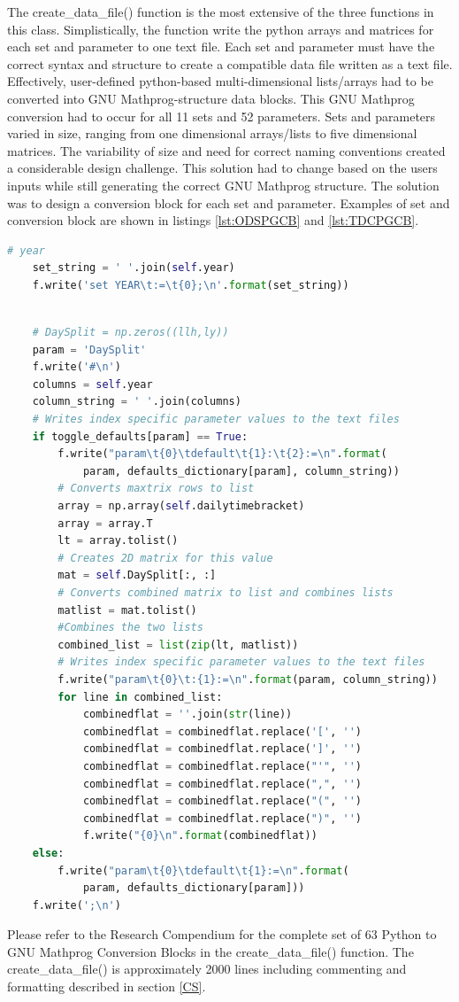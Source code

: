 \documentclass[12pt]{article}
\begin{document}
The create\_data\_file() function is the most extensive of the three functions in this class.
Simplistically, the function write the python arrays and matrices for each set and parameter to one text file.
Each set and parameter must have the correct syntax and structure to create a compatible data file written as a text file.
Effectively, user-defined python-based multi-dimensional lists/arrays had to be converted into GNU Mathprog-structure data blocks.
This GNU Mathprog conversion had to occur for all 11 sets and 52 parameters.
Sets and parameters varied in size, ranging from one dimensional arrays/lists to five dimensional matrices.
The variability of size and need for correct naming conventions created a considerable design challenge.
This solution had to change based on the users inputs while still generating the correct GNU Mathprog structure.
The solution was to design a conversion block for each set and parameter. 
Examples of set and conversion block are shown in listings \ref{lst:ODSPGCB} and \ref{lst:TDCPGCB}.

\begin{lstlisting}[language=Python,label = {lst:ODSPGCB},caption = {One Dimensional Set Python to GNU Mathprog Conversion Block}]
	# year
	set_string = ' '.join(self.year)
	f.write('set YEAR\t:=\t{0};\n'.format(set_string))
\end{lstlisting}

\begin{lstlisting}[language=Python,label = {lst:TDCPGCB},caption = Two Dimensional Parameter Python to GNU Mathprog Conversion Block]

	# DaySplit = np.zeros((llh,ly))
	param = 'DaySplit'
	f.write('#\n')
	columns = self.year
	column_string = ' '.join(columns)
	# Writes index specific parameter values to the text files
	if toggle_defaults[param] == True:
		f.write("param\t{0}\tdefault\t{1}:\t{2}:=\n".format(
			param, defaults_dictionary[param], column_string))
		# Converts maxtrix rows to list
		array = np.array(self.dailytimebracket)
		array = array.T
		lt = array.tolist()
		# Creates 2D matrix for this value
		mat = self.DaySplit[:, :]
		# Converts combined matrix to list and combines lists
		matlist = mat.tolist()
		#Combines the two lists
		combined_list = list(zip(lt, matlist))
		# Writes index specific parameter values to the text files
		f.write("param\t{0}\t:{1}:=\n".format(param, column_string))
		for line in combined_list:
			combinedflat = ''.join(str(line))
			combinedflat = combinedflat.replace('[', '')
			combinedflat = combinedflat.replace(']', '')
			combinedflat = combinedflat.replace("'", '')
			combinedflat = combinedflat.replace(",", '')
			combinedflat = combinedflat.replace("(", '')
			combinedflat = combinedflat.replace(")", '')
			f.write("{0}\n".format(combinedflat))
	else:
		f.write("param\t{0}\tdefault\t{1}:=\n".format(
			param, defaults_dictionary[param]))
	f.write(';\n')
\end{lstlisting}
Please refer to the Research Compendium for the complete set of 63 Python to GNU Mathprog Conversion Blocks in the create\_data\_file() function.
The create\_data\_file() is approximately 2000 lines including commenting and formatting described in section \ref{CS}.
\end{document}

